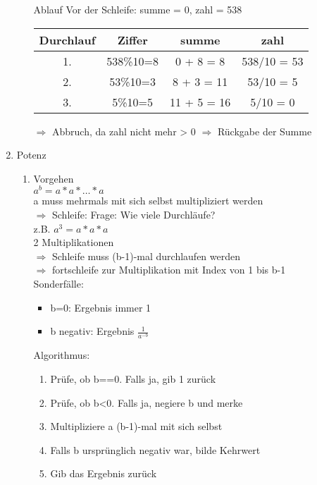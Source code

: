 \begin{enumerate}
\begin{enumerate}
Ablauf
Vor der Schleife: summe = 0, zahl = 538
\begin{table}[h]
\begin{center}
\begin{tabular}{c|c|c|c}
Durchlauf & Ziffer & summe & zahl\\
\hline
1. & 538\%10=8 & 0 + 8 = 8 & 538/10 = 53 \\
2. & 53\%10=3 & 8 + 3 = 11 & 53/10 = 5 \\
3. & 5\%10=5 & 11 + 5 = 16 & 5/10 = 0 \\
\end{tabular}
\end{center}
\end{table}
$\Rightarrow$ Abbruch, da zahl nicht mehr > 0
$\Rightarrow$ Rückgabe der Summe
\end{enumerate}
\item Potenz
\begin{enumerate}
\item Vorgehen \\
$a^b = a*a* \dots *a$ \\
a muss mehrmals mit sich selbst multipliziert werden \\
$\Rightarrow$ Schleife: Frage: Wie viele Durchläufe? \\
z.B. $a^3 = a * a * a$ \\
2 Multiplikationen \\
$\Rightarrow$ Schleife muss (b-1)-mal durchlaufen werden \\
$\Rightarrow$ fortschleife zur Multiplikation mit Index von 1 bis b-1 \\
Sonderfälle: \\
\begin{itemize}
\item b=0: Ergebnis immer 1 \\
\item b negativ: Ergebnis $\frac{1}{a^{-b}}$ \\
\end{itemize}
Algorithmus:
\begin{enumerate}
\item Prüfe, ob b==0. Falls ja, gib 1 zurück
\item Prüfe, ob b<0. Falls ja, negiere b und merke
\item Multipliziere a (b-1)-mal mit sich selbst
\item Falls b ursprünglich negativ war, bilde Kehrwert
\item Gib das Ergebnis zurück
\end{enumerate}

\end{enumerate}
\end{enumerate}
